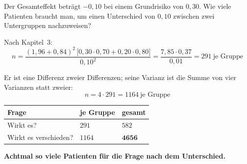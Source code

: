 \begin{aufgabe}
Der Gesamteffekt beträgt $-0{,}10$ bei einem Grundrisiko von $0{,}30$. Wie viele Patienten braucht man, um einen Unterschied von $0{,}10$ zwischen zwei Untergruppen nachzuweisen?

\loesung
{}
Nach Kapitel~3:
\[ n = \frac{(1{,}96+0{,}84)^{2}\,\bigl[0{,}30\cdot0{,}70 + 0{,}20\cdot0{,}80\bigr]}{0{,}10^{2}} = \frac{7{,}85\cdot0{,}37}{0{,}01} = 291 \ \text{je Gruppe} \]

Er ist eine Differenz zweier Differenzen; seine Varianz ist die Summe von vier Varianzen statt zweier:
\[ n = 4\cdot291 = 1164 \ \text{je Gruppe} \]

\begin{center}
{\small
\renewcommand{\arraystretch}{1.48}
\begin{tabular}{@{}P{3.0cm}P{2.2cm}P{2.4cm}@{}}
\toprule
\textbf{Frage} & \textbf{je Gruppe} & \textbf{gesamt}\\
\midrule
Wirkt es? & $291$ & $582$\\
Wirkt es verschieden? & $1164$ & $\mathbf{4656}$\\
\bottomrule
\end{tabular}}
\end{center}

\begin{center}
\begin{minipage}{0.9\textwidth}
\textbf{Achtmal so viele Patienten für die Frage nach dem Unterschied.}
\end{minipage}
\end{center}

\begin{center}
\begin{minipage}{0.88\textwidth}
\end{minipage}
\end{center}
\end{aufgabe}

